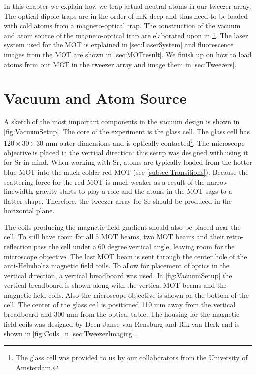 In this chapter we explain how we trap actual neutral atoms in our tweezer array. 
The optical dipole traps are in the order of mK deep and thus need to be loaded with cold atoms from a magneto-optical trap. 
The construction of the vacuum and atom source of the magneto-optical trap are elaborated upon in \cref{sec:VacuumAtom}.
The laser system used for the MOT is explained in \cref{sec:LaserSystem} and fluorescence images from the MOT are shown in \cref{sec:MOTresult}.
We finish up on how to load atoms from our MOT in the tweezer array and image them in \cref{sec:Tweezers}.

\section{Vacuum and Atom Source}\label{sec:VacuumAtom}

A sketch of the most important components in the vacuum design is shown in \cref{fig:VacuumSetup}.
The core of the experiment is the glass cell.
The glass cell has $120\times30\times30$ mm outer dimensions and is optically contacted\footnote{The glass cell was provided to us by our collaborators from the University of Amsterdam.}.
The microscope objective is placed in the vertical direction: this setup was designed with using it for Sr in mind.
When working with Sr, atoms are typically loaded from the hotter blue MOT into the much colder red MOT (see \cref{subsec:Transitions}).
Because the scattering force for the red MOT is much weaker as a result of the narrow-linewidth, gravity starts to play a role and the atoms in the MOT sags to a flatter shape. 
Therefore, the tweezer array for Sr should be produced in the horizontal plane. 

The coils producing the magnetic field gradient should also be placed near the cell. 
To still have room for all 6 MOT beams, two MOT beams and their retro-reflection pass the cell under a 60 degree vertical angle, leaving room for the microscope objective. 
The last MOT beam is sent through the center hole of the anti-Helmholtz magnetic field coils.
To allow for placement of optics in the vertical direction, a vertical breadboard was used. 
In \cref{fig:VacuumSetup} the vertical breadboard is shown along with the vertical MOT beams and the magnetic field coils. 
Also the microscope objective is shown on the bottom of the cell.
The center of the glass cell is positioned 110 mm away from the vertical breadboard and 300 mm from the optical table. 
The housing for the magnetic field coils was designed by Deon Janse van Rensburg and Rik van Herk and is shown in \cref{fig:Coils} in \cref{sec:TweezerImaging}.

